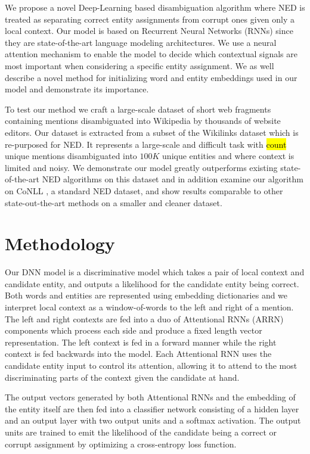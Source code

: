 \documentclass[11pt]{article}
\begin{document}
	We propose a novel Deep-Learning based disambiguation algorithm where NED is treated as separating correct entity assignments from corrupt ones given only a local context. Our model is based on Recurrent Neural Networks (RNNs) since they are state-of-the-art language modeling architectures. We use a neural attention mechanism to enable the model to decide which contextual signals are most important when considering a specific entity assignment. We as well describe a novel method for initializing word and entity embeddings used in our model and demonstrate its importance.
	
	To test our method we craft a large-scale dataset of short web fragments containing mentions disambiguated into Wikipedia by thousands of website editors. Our dataset is extracted from a subset of the Wikilinks dataset \cite{singh12:wiki-links} which is re-purposed for NED. It represents a large-scale and difficult task with \hl{count} unique mentions disambiguated into $100K$ unique entities and where context is limited and noisy. We demonstrate our model greatly outperforms existing state-of-the-art NED algorithms on this dataset and in addition examine our algorithm on CoNLL \cite{hoffart2011robust}, a standard NED dataset, and show results comparable to other state-out-the-art methods on a smaller and cleaner dataset.
	
	\section{Methodology}

	Our DNN model is a discriminative model which takes a pair of local context and candidate entity, and outputs a likelihood for the candidate entity being correct. Both words and entities are represented using embedding dictionaries and we interpret local context as a window-of-words to the left and right of a mention. The left and right contexts are fed into a duo of Attentional RNNs (ARRN) components which process each side and produce a fixed length vector representation. The left context is fed in a forward manner while the right context is fed backwards into the model. Each Attentional RNN uses the candidate entity input to control its attention, allowing it to attend to the most discriminating parts of the context given the candidate at hand. 
	
	The output vectors generated by both Attentional RNNs and the embedding of the entity itself are then fed into a classifier network consisting of a hidden layer and an output layer with two output units and a softmax activation. The output units are trained to emit the likelihood of the candidate being a correct or corrupt assignment by optimizing a cross-entropy loss function. 
	
\end{document}
